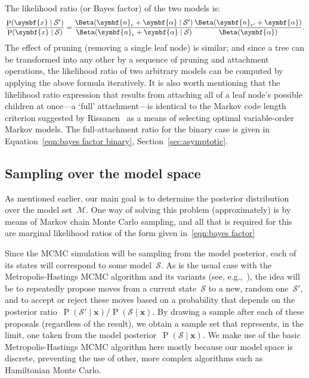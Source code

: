 \documentclass[11pt,a4paper]{article}
\newcommand\mc[1]{\mathcal{#1}}               %
\newcommand\ub[1]{\symbf{#1}}                 %
\DeclareMathOperator\Pb{P}                    %
\DeclarePairedDelimiter\lr{\lparen}{\rparen}  %
\begin{document}
The likelihood ratio (or Bayes factor) of the two models is:
\begin{equation}\label{eqn:bayes factor}
  \frac{\Pb\lr{\ub{x} \mid \mc{S}'}}{\Pb\lr{\ub{x} \mid \mc{S}}} =
    \frac{\Beta\lr{\ub{n}_r + \ub{\alpha} \mid \mc{S}'}}
    {\Beta\lr{\ub{n}_r + \ub{\alpha} \mid \mc{S}}}
    \frac{\Beta\lr{\ub{n}_{r'} + \ub{\alpha}}}{\Beta\lr{\ub{\alpha}}}.
\end{equation}
The effect of pruning (removing a single leaf node) is similar; and since a tree
can be transformed into any other by a sequence of pruning and attachment
operations, the likelihood ratio of two arbitrary models can be computed by
applying the above formula iteratively. It is also worth mentioning that the
likelihood ratio expression that results from attaching all of a leaf node's
possible children at once---a `full' attachment---is identical to the Markov
code length criterion suggested by Rissanen~\cite{rissanen1986complexity} as a
means of selecting optimal variable-order Markov models. The full-attachment
ratio for the binary case is given in Equation~\eqref{eqn:bayes factor binary},
Section~\ref{sec:asymptotic}.

\subsection{Sampling over the model space} %

As mentioned earlier, our main goal is to determine the posterior distribution
over the model set~\(\mc{M}\). One way of solving this problem (approximately)
is by means of Markov chain Monte Carlo sampling, and all that is required for
this are marginal likelihood ratios of the form given in~\eqref{eqn:bayes
factor}

Since the MCMC simulation will be sampling from the model posterior, each of its
states will correspond to some model~\(\mc{S}\). As is the usual case with the
Metropolis-Hastings MCMC algorithm and its variants (see,
e.g.,~\cite{brooks2011handbook}), the idea will be to repeatedly propose moves
from a current state~\(\mc{S}\) to a new, random one~\(\mc{S}'\), and to accept
or reject these moves based on a probability that depends on the posterior
ratio~\({\Pb(\mc{S}' \mid \ub{x})/\!\Pb(\mc{S} \mid \ub{x})}\). By drawing a
sample after each of these proposals (regardless of the result), we obtain a
sample set that represents, in the limit, one taken from the model
posterior~\(\Pb(\mc{S} \mid \ub{x})\). We make use of the basic
Metropolis-Hastings MCMC algorithm here mostly because our model space is
discrete, preventing the use of other, more complex algorithms such as
Hamiltonian Monte Carlo.
\end{document}

